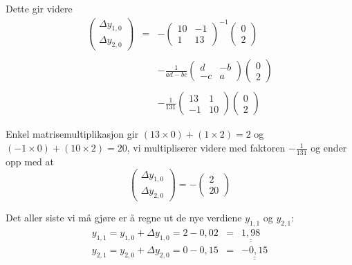 \documentclass[norsk, a4paper, 12pt, titlepage]{article}
\begin{document}
Dette gir videre
\begin{eqnarray*}
\left(
\begin{array}{cc}
\Delta y_{1,0}\\
\Delta y_{2,0}
\end{array}
\right)
& = & -
\left(
\begin{array}{cc}
10 & -1 \\
1  & 13
\end{array}
\right)^{-1}
\left(
\begin{array}{cc}
0\\
2
\end{array}
\right)\\
&&\\
&&
-\frac{1}{ad-bc}
\left(
\begin{array}{cc}
d & -b \\
-c  & a
\end{array}
\right)
\left(
\begin{array}{cc}
0\\
2
\end{array}
\right)\\
&&\\
&&
-\frac{1}{131}
\left(
\begin{array}{cc}
13 & 1 \\
-1  & 10
\end{array}
\right)
\left(
\begin{array}{cc}
0\\
2
\end{array}
\right)
\end{eqnarray*}

Enkel matrisemultiplikasjon gir $(13 \times 0) + (1 \times 2) = 2$ og
$(-1 \times 0) + (10 \times 2) = 20$, vi multipliserer videre med
faktoren $-\frac{1}{131}$ og ender opp med at
\begin{equation*}
\left(
\begin{array}{cc}
\Delta y_{1,0}\\
\Delta y_{2,0}
\end{array}
\right)
= -
\left(
\begin{array}{c}
2\\
20
\end{array}
\right)
\end{equation*}

Det aller siste vi må gjøre er å regne ut de nye verdiene $y_{1,1}$ og
$y_{2,1}$:
\begin{eqnarray*}
y_{1,1} = y_{1,0} + \Delta y_{1,0} = 2 - 0,02 & = &
\underline{\underline{1,98}}\\
y_{2,1} = y_{2,0} + \Delta y_{2,0} = 0 - 0,15 & = &
\underline{\underline{-0,15}}
\end{eqnarray*}
\end{document}
